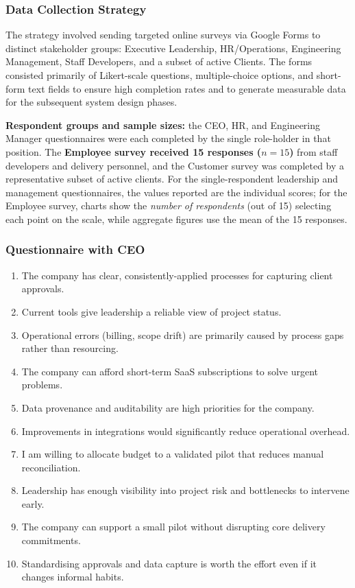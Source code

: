 \documentclass[12pt,a4paper]{report}
\begin{document}
\subsubsection{Data Collection Strategy}
The strategy involved sending targeted online surveys via Google Forms to distinct stakeholder groups: Executive Leadership, HR/Operations, Engineering Management, Staff Developers, and a subset of active Clients. The forms consisted primarily of Likert-scale questions, multiple-choice options, and short-form text fields to ensure high completion rates and to generate measurable data for the subsequent system design phases.

\begin{noteBox}
\textbf{Respondent groups and sample sizes:} the CEO, HR, and Engineering Manager questionnaires were each completed by the single role-holder in that position. The \textbf{Employee survey received 15 responses ($n = 15$)} from staff developers and delivery personnel, and the Customer survey was completed by a representative subset of active clients. For the single-respondent leadership and management questionnaires, the values reported are the individual scores; for the Employee survey, charts show the \emph{number of respondents} (out of 15) selecting each point on the scale, while aggregate figures use the mean of the 15 responses.
\end{noteBox}

\subsubsection{Questionnaire with CEO}
\begin{enumerate}[leftmargin=2em]
    \item The company has clear, consistently-applied processes for capturing client approvals.
    \item Current tools give leadership a reliable view of project status.
    \item Operational errors (billing, scope drift) are primarily caused by process gaps rather than resourcing.
    \item The company can afford short-term SaaS subscriptions to solve urgent problems.
    \item Data provenance and auditability are high priorities for the company.
    \item Improvements in integrations would significantly reduce operational overhead.
    \item I am willing to allocate budget to a validated pilot that reduces manual reconciliation.
    \item Leadership has enough visibility into project risk and bottlenecks to intervene early.
    \item The company can support a small pilot without disrupting core delivery commitments.
    \item Standardising approvals and data capture is worth the effort even if it changes informal habits.
\end{enumerate}
\end{document}
